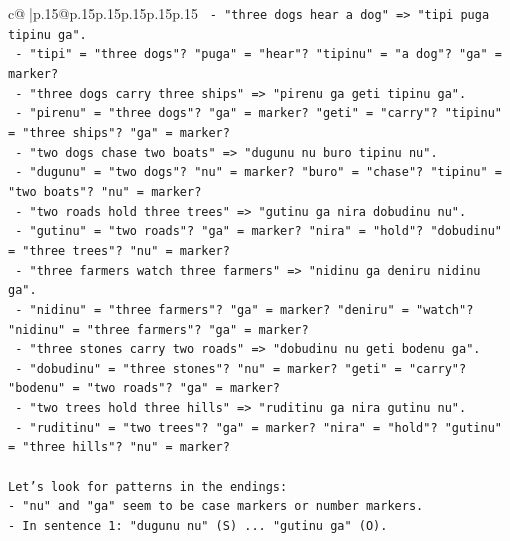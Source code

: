 \documentclass{article}
\begin{document}
{\begin{supertabular}{c@{$\;$}|p{.15\linewidth}@{}p{.15\linewidth}p{.15\linewidth}p{.15\linewidth}p{.15\linewidth}p{.15\linewidth}}
{{{\texttt{                              {-} "three dogs hear a dog" => "tipi puga tipinu ga".} \\
\texttt{                                {-} "tipi" = "three dogs"? "puga" = "hear"? "tipinu" = "a dog"? "ga" = marker?} \\
\texttt{                              {-} "three dogs carry three ships" => "pirenu ga geti tipinu ga".} \\
\texttt{                                {-} "pirenu" = "three dogs"? "ga" = marker? "geti" = "carry"? "tipinu" = "three ships"? "ga" = marker?} \\
\texttt{                              {-} "two dogs chase two boats" => "dugunu nu buro tipinu nu".} \\
\texttt{                                {-} "dugunu" = "two dogs"? "nu" = marker? "buro" = "chase"? "tipinu" = "two boats"? "nu" = marker?} \\
\texttt{                              {-} "two roads hold three trees" => "gutinu ga nira dobudinu nu".} \\
\texttt{                                {-} "gutinu" = "two roads"? "ga" = marker? "nira" = "hold"? "dobudinu" = "three trees"? "nu" = marker?} \\
\texttt{                              {-} "three farmers watch three farmers" => "nidinu ga deniru nidinu ga".} \\
\texttt{                                {-} "nidinu" = "three farmers"? "ga" = marker? "deniru" = "watch"? "nidinu" = "three farmers"? "ga" = marker?} \\
\texttt{                              {-} "three stones carry two roads" => "dobudinu nu geti bodenu ga".} \\
\texttt{                                {-} "dobudinu" = "three stones"? "nu" = marker? "geti" = "carry"? "bodenu" = "two roads"? "ga" = marker?} \\
\texttt{                              {-} "two trees hold three hills" => "ruditinu ga nira gutinu nu".} \\
\texttt{                                {-} "ruditinu" = "two trees"? "ga" = marker? "nira" = "hold"? "gutinu" = "three hills"? "nu" = marker?} \\
\\ 
\texttt{Let's look for patterns in the endings:} \\
\texttt{{-} "nu" and "ga" seem to be case markers or number markers.} \\
\texttt{{-} In sentence 1: "dugunu nu" (S) ... "gutinu ga" (O).} \\
}}}
\end{supertabular}}
\end{document}
